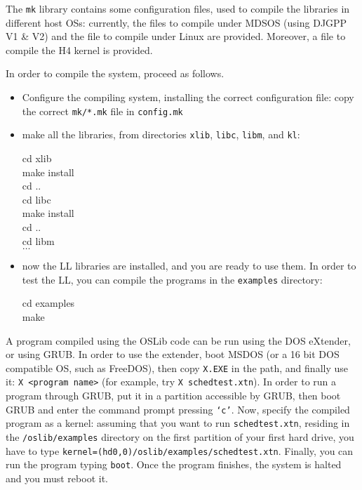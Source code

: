 \documentclass[a4paper]{report}
\begin{document}
The {\tt mk} library contains some configuration files, used to
compile the libraries in different host OSs: currently, the files
to compile under MDSOS (using DJGPP V1 \& V2) and the file to compile
under Linux are provided. Moreover, a file to compile the H4 kernel is
provided.

In order to compile the system, proceed as follows.
\begin{itemize}
	\item Configure the compiling system, installing the 
		correct configuration file: copy the correct {\tt mk/*.mk}
		file in {\tt config.mk}
	\item make all the libraries, from directories {\tt xlib}, 
		{\tt libc}, {\tt libm}, and {\tt kl}:
		
		\begin{minipage}[t]{10cm}
		\begin{tt}
		\begin{tabbing}
		cd xlib					\\
		make install				\\
		cd ..					\\
		cd libc					\\
		make install				\\
		cd ..					\\
		cd libm					\\
		$\ldots$
		\end{tabbing}
		\end{tt}
		\end{minipage}
	\item now the LL libraries are installed, and you are ready to
		use them. In order to test the LL, you can compile
		the programs in the {\tt examples} directory:

		\begin{minipage}[t]{10cm}
		\begin{tt}
		\begin{tabbing}
		cd examples				\\
		make
		\end{tabbing}
		\end{tt}
		\end{minipage}
\end{itemize}

A program compiled using the OSLib code can be run using the DOS
eXtender, or using GRUB. In order to use the extender, boot MSDOS (or
a 16 bit DOS compatible OS, such as FreeDOS), then copy {\tt X.EXE}
in the path, and finally use it: {\tt X <program name>} (for example,
try {\tt X schedtest.xtn}). In order to run a
program through GRUB, put it in a partition accessible by GRUB, then
boot GRUB and enter the command prompt pressing {\tt `c'}. Now,
specify the compiled program as a kernel: assuming that you want to run
{\tt schedtest.xtn}, residing in the {\tt /oslib/examples} directory on
the first partition of your first hard drive, you have to type
{\tt kernel=(hd0,0)/oslib/examples/schedtest.xtn}. Finally, you can
run the program typing {\tt boot}. Once the program finishes, the
system is halted and you must reboot it.
\end{document}

